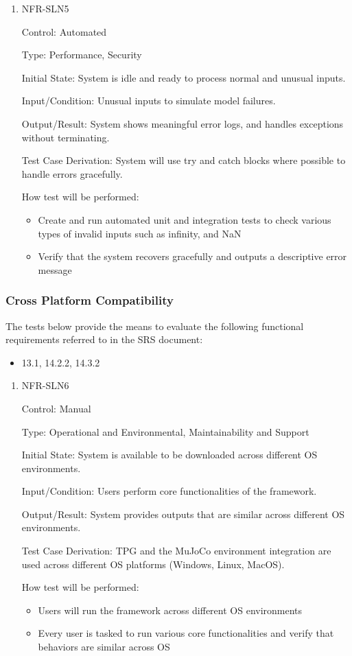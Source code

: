 \documentclass[12pt, titlepage]{article}
\begin{document}
\begin{enumerate}
\item NFR-SLN5

Control: Automated

Type: Performance, Security

Initial State: System is idle and ready to process normal and unusual inputs.

Input/Condition: Unusual inputs to simulate model failures.

Output/Result: System shows meaningful error logs, and handles exceptions without terminating.

Test Case Derivation: System will use try and catch blocks where possible to handle errors gracefully.

How test will be performed:
\begin{itemize}
  \item Create and run automated unit and integration tests to check various types of invalid inputs such as infinity, and NaN
  \item Verify that the system recovers gracefully and outputs a descriptive error message
\end{itemize}

\end{enumerate}

\subsubsection{Cross Platform Compatibility}

The tests below provide the means to evaluate the following functional requirements referred to in the SRS document:
\begin{itemize}
  \item 13.1, 14.2.2, 14.3.2
\end{itemize}

\begin{enumerate}
\item NFR-SLN6

Control: Manual

Type: Operational and Environmental, Maintainability and Support

Initial State: System is available to be downloaded across different OS environments.

Input/Condition: Users perform core functionalities of the framework.

Output/Result: System provides outputs that are similar across different OS environments.

Test Case Derivation: TPG and the MuJoCo environment integration are used across different OS platforms (Windows, Linux, MacOS).

How test will be performed:
\begin{itemize}
  \item Users will run the framework across different OS environments
  \item Every user is tasked to run various core functionalities and verify that behaviors are similar across OS
\end{itemize}

\end{enumerate}
\end{document}
